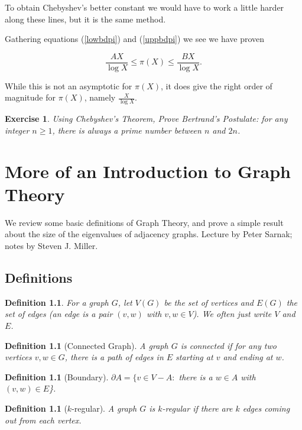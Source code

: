 \documentclass[12pt,letterpaper]{report}
\newcommand\be{\begin{equation}}
\newcommand\ee{\end{equation}}
\newtheorem{defi}[thm]{Definition}
\newtheorem{exe}[thm]{Exercise}
\begin{document}
To obtain Chebyshev's better constant we would have to work a
little harder along these lines, but it is the same method.

Gathering equations (\ref{lowbdpi}) and (\ref{uppbdpi}) we see we
have proven

\be \frac{AX}{\log X}\leq \pi (X)\leq \frac{BX}{\log X}. \ee

While this is not an asymptotic for $\pi(X)$, it does give the
right order of magnitude for $\pi(X)$, namely $\frac{X}{\log X}$.

\begin{exe} Using Chebyshev's Theorem, Prove Bertrand's Postulate:
for any integer $n \ge 1$, there is always a prime number between
$n$ and $2n$. \end{exe}





\chapter{More of an Introduction to Graph Theory}

We review some basic definitions of Graph Theory, and prove a
simple result about the size of the eigenvalues of adjacency
graphs. Lecture by Peter Sarnak; notes by Steven J. Miller.

\section{Definitions}

\begin{defi} For a graph $G$, let $V(G)$ be the
set of vertices and $E(G)$ the set of edges (an edge is a pair
$(v,w)$ with $v, w \in V$). We often just write $V$ and $E$.
\end{defi}

\begin{defi} [Connected Graph] A graph $G$ is connected if for any two
vertices $v, w \in G$, there is a path of edges in $E$ starting at
$v$ and ending at $w$.
\end{defi}

\begin{defi}[Boundary] $\partial A = \{v \in V - A:$ there is a $w \in
A$ with $(v,w) \in E$\}. \end{defi}

\begin{defi}[$k$-regular] A graph $G$ is $k$-regular if there are
$k$ edges coming out from each vertex. \end{defi}
\end{document}
